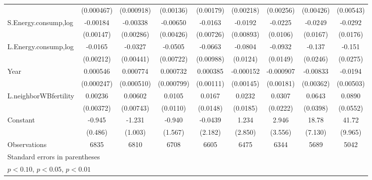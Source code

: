 \begin{table}[htbp]
\begin{tabular}{l*{8}{c}}
                    &  (0.000467)         &  (0.000918)         &   (0.00136)         &   (0.00179)         &   (0.00218)         &   (0.00256)         &   (0.00426)         &   (0.00543)         \\
[1em]
S.Energy.consump,log&    -0.00184         &    -0.00338         &    -0.00650         &     -0.0163\sym{**} &     -0.0192\sym{**} &     -0.0225\sym{**} &     -0.0249         &     -0.0292         \\
                    &   (0.00147)         &   (0.00286)         &   (0.00426)         &   (0.00726)         &   (0.00893)         &    (0.0106)         &    (0.0167)         &    (0.0176)         \\
[1em]
L.Energy.consump,log&     -0.0165\sym{***}&     -0.0327\sym{***}&     -0.0505\sym{***}&     -0.0663\sym{***}&     -0.0804\sym{***}&     -0.0932\sym{***}&      -0.137\sym{***}&      -0.151\sym{***}\\
                    &   (0.00212)         &   (0.00441)         &   (0.00722)         &   (0.00988)         &    (0.0124)         &    (0.0149)         &    (0.0246)         &    (0.0275)         \\
[1em]
Year                &    0.000546\sym{**} &    0.000774         &    0.000732         &    0.000385         &   -0.000152         &   -0.000907         &    -0.00833\sym{**} &     -0.0194\sym{***}\\
                    &  (0.000247)         &  (0.000510)         &  (0.000799)         &   (0.00111)         &   (0.00145)         &   (0.00181)         &   (0.00362)         &   (0.00503)         \\
[1em]
L.neighborWBfertility&     0.00236         &     0.00602         &      0.0105         &      0.0167         &      0.0232         &      0.0307         &      0.0643         &      0.0890         \\
                    &   (0.00372)         &   (0.00743)         &    (0.0110)         &    (0.0148)         &    (0.0185)         &    (0.0222)         &    (0.0398)         &    (0.0552)         \\
[1em]
Constant            &      -0.945\sym{*}  &      -1.231         &      -0.940         &     -0.0439         &       1.234         &       2.946         &       18.78\sym{***}&       41.72\sym{***}\\
                    &     (0.486)         &     (1.003)         &     (1.567)         &     (2.182)         &     (2.850)         &     (3.556)         &     (7.130)         &     (9.965)         \\
\hline
Observations        &        6835         &        6810         &        6708         &        6605         &        6475         &        6344         &        5689         &        5042         \\
\hline\hline
\multicolumn{9}{l}{\footnotesize Standard errors in parentheses}\\
\multicolumn{9}{l}{\footnotesize \sym{*} \(p<0.10\), \sym{**} \(p<0.05\), \sym{***} \(p<0.01\)}\\
\end{tabular}
\end{table}
